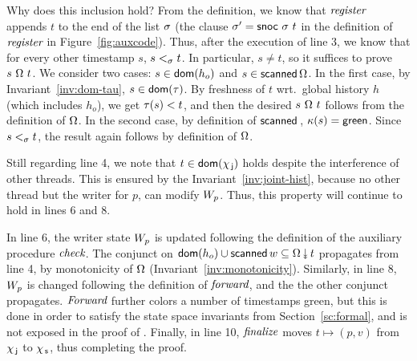 Why does this inclusion hold? From the definition, we know that
$\textit{register}$ appends $t$ to the end of the list $\sigma$ (the
clause $\ordlistP = \mathsf{snoc}\ {\ordlist}\ t$ in the definition of
$\textit{register}$ in Figure~\ref{fig:auxcode}). Thus, after the
execution of line 3, we know that for every other timestamp $s$, $s
\mathrel{<_\sigma} t$. In particular, $s \neq t$, so it suffices to prove
$s\ {\stableorder}\ t$.
%
We consider two cases: $s \in \mathsf{dom}(h_o)$ and $s \in
\mathsf{scanned}\,\Omega$.  In the first case, by
Invariant~\ref{inv:dom-tau}, $s \in \mathsf{dom}(\tau)$. By freshness of $t$
wrt.~global history $h$ (which includes $h_o$), we get $\tau(s) < t$,
and then the desired $s\ {\stableorder}\ t$ follows from the
definition of $\Omega$.  In the second case, by definition of
$\scanned$, $\kappa(s) = \mathsf{green}$. Since $s \mathrel{<_\sigma} t$, the result
again follows by definition of $\Omega$.

Still regarding line 4, we note that $t \in \mathsf{dom}(\chi_{\, \mathsf{j}})$ holds
despite the interference of other threads. This is ensured by the
Invariant~\ref{inv:joint-hist}, because no other thread but the writer
for $p$, can modify $W_p$. Thus, this property will continue to hold
in lines 6 and 8.

In line 6, the writer state $W_p$ is updated following the definition
of the auxiliary procedure $\textit{check}$. The conjunct on $\dom{h_o}
\cup \scanned{w} \subseteq \sideal{\stableorder}{t}$ propagates from
line 4, by monotonicity of $\Omega$
(Invariant~\ref{inv:monotonicity}).
%
Similarly, in line 8, $W_p$ is changed following the definition of
$\textit{forward}$, and the the other conjunct
propagates. $\textit{Forward}$ further colors a number of timestamps
green, but this is done in order to satisfy the state space invariants
from Section~\ref{sc:formal}, and is not exposed in the proof of
\jywrite.
%
Finally, in line 10, $\textit{finalize}$ moves $t\mapsto(p, v)$ from
$\chi_{\, \mathsf{j}}$ to $\chi_{\, \mathsf{s}}$, thus completing the proof. 





